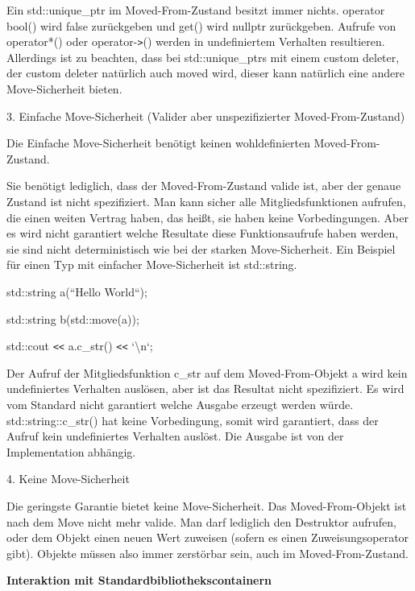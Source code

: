 \documentclass{article}
\begin{document}
Ein std::unique\_ptr im Moved-From-Zustand besitzt immer nichts. operator bool() 
wird false zurückgeben und get() wird nullptr zurückgeben. Aufrufe von operator*() 
oder operator-\texttt{>}() werden in undefiniertem Verhalten resultieren. Allerdings 
ist zu beachten, dass bei std::unique\_ptrs mit einem custom deleter, der custom 
deleter natürlich auch moved wird, dieser kann natürlich eine andere Move-Sicherheit 
bieten.

\vspace{12pt}
3. Einfache Move-Sicherheit (Valider aber unspezifizierter Moved-From-Zustand)

Die Einfache Move-Sicherheit benötigt keinen wohldefinierten Moved-From-Zustand.

Sie benötigt lediglich, dass der Moved-From-Zustand valide ist, aber der genaue 
Zustand ist nicht spezifiziert. Man kann sicher alle Mitgliedsfunktionen aufrufen, 
die einen weiten Vertrag haben, das heißt, sie haben keine Vorbedingungen. Aber 
es wird nicht garantiert welche Resultate diese Funktionsaufrufe haben werden, 
sie sind nicht deterministisch wie bei der starken Move-Sicherheit. Ein Beispiel 
für einen Typ mit einfacher Move-Sicherheit ist std::string.

\vspace{12pt}
std::string a(``Hello World``);

std::string b(std::move(a));

std::cout \texttt{<}\texttt{<} a.c\_str() \texttt{<}\texttt{<} `\textbackslash{}n`;

\vspace{12pt}
Der Aufruf der Mitgliedsfunktion c\_str auf dem Moved-From-Objekt a wird kein undefiniertes 
Verhalten auslösen, aber ist das Resultat nicht spezifiziert. Es wird vom Standard 
nicht garantiert welche Ausgabe erzeugt werden würde. std::string::c\_str() hat 
keine Vorbedingung, somit wird garantiert, dass der Aufruf kein undefiniertes Verhalten 
auslöst. Die Ausgabe ist von der Implementation abhängig.

\vspace{12pt}
4. Keine Move-Sicherheit

Die geringste Garantie bietet keine Move-Sicherheit. Das Moved-From-Objekt ist 
nach dem Move nicht mehr valide. Man darf lediglich den Destruktor aufrufen, oder 
dem Objekt einen neuen Wert zuweisen (sofern es einen Zuweisungsoperator gibt). 
Objekte müssen also immer zerstörbar sein, auch im Moved-From-Zustand. 

\vspace{25pt}
\textbf{Interaktion mit Standardbibliothekscontainern}
\end{document}
